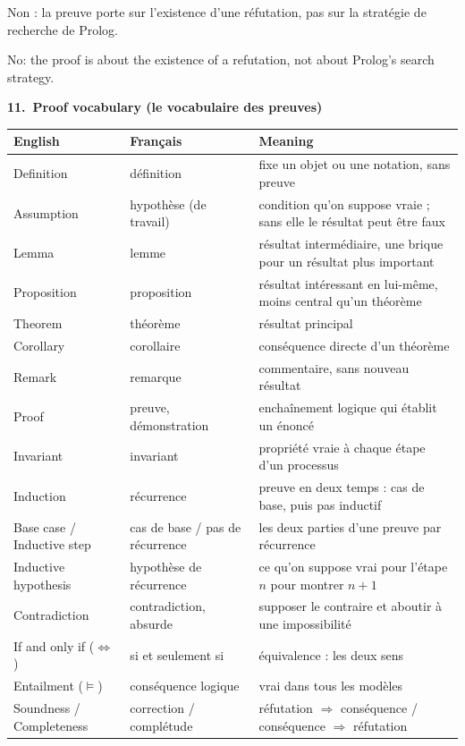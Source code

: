 \documentclass[10pt]{article}
\newcommand{\titrebox}[2]{\needspace{10\baselineskip}\vspace{8pt}
  \begin{tcolorbox}[colback=marine, colframe=marine, arc=0pt, boxrule=0pt,
    top=4pt, bottom=4pt, left=8pt]
  \color{white}\Large\bfseries #1.~#2
  \end{tcolorbox}\vspace{2pt}}
\newcommand{\st}[1]{\par\needspace{7\baselineskip}\vspace{5pt}{\normalsize\bfseries\textcolor{marine}{#1}}\par\vspace{2pt}}
\begin{document}
\st{``Est-ce que cela dépend du solveur ou de Prolog ?''}
\begin{dire}
Non : la preuve porte sur l'existence d'une réfutation, pas sur la stratégie de recherche de Prolog.
\end{dire}
\begin{direEN}
No: the proof is about the existence of a refutation, not about Prolog's search strategy.
\end{direEN}

\titrebox{11}{Proof vocabulary (le vocabulaire des preuves)}
\renewcommand{\arraystretch}{1.25}
\begin{tabular}{@{}L{3.6cm}L{3.4cm}L{9.4cm}@{}}
\textbf{English} & \textbf{Français} & \textbf{Meaning}\\\hline
Definition & définition & fixe un objet ou une notation, sans preuve\\
Assumption & hypothèse (de travail) & condition qu'on suppose vraie ; sans elle le résultat peut être faux\\
Lemma & lemme & résultat intermédiaire, une brique pour un résultat plus important\\
Proposition & proposition & résultat intéressant en lui-même, moins central qu'un théorème\\
Theorem & théorème & résultat principal\\
Corollary & corollaire & conséquence directe d'un théorème\\
Remark & remarque & commentaire, sans nouveau résultat\\
Proof & preuve, démonstration & enchaînement logique qui établit un énoncé\\
Invariant & invariant & propriété vraie à chaque étape d'un processus\\
Induction & récurrence & preuve en deux temps : cas de base, puis pas inductif\\
Base case / Inductive step & cas de base / pas de récurrence & les deux parties d'une preuve par récurrence\\
Inductive hypothesis & hypothèse de récurrence & ce qu'on suppose vrai pour l'étape $n$ pour montrer $n+1$\\
Contradiction & contradiction, absurde & supposer le contraire et aboutir à une impossibilité\\
If and only if ($\iff$) & si et seulement si & équivalence : les deux sens\\
Entailment ($\models$) & conséquence logique & vrai dans tous les modèles\\
Soundness / Completeness & correction / complétude & réfutation $\Rightarrow$ conséquence / conséquence $\Rightarrow$ réfutation\\
\end{tabular}
\end{document}
